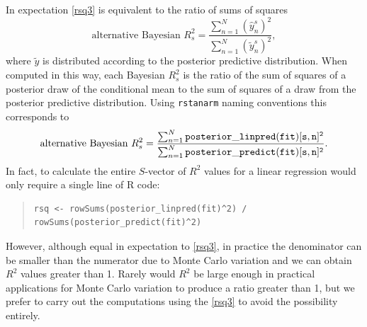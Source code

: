 \documentclass[11pt]{article}
\begin{document}
In expectation \eqref{rsq3} is equivalent to the ratio of sums of squares
%
\begin{equation}\label{rsq4}
\mbox{alternative Bayesian } R^2_s = 
	 \frac{\sum_{n=1}^N (\hat{y}_n^s)^2}{\sum_{n=1}^N (\tilde{y}_n^s)^2},
\end{equation}
%
where $\tilde{y}$ is distributed according to the posterior predictive distribution. 
When computed in this way, each Bayesian $R^2_s$ is the ratio of the sum of 
squares of a posterior draw of the conditional mean to the sum of squares of a 
draw from the posterior predictive distribution. Using {\tt rstanarm} naming 
conventions this corresponds to 
%
\begin{equation*}
\mbox{alternative Bayesian } R^2_s = 
	\frac{\sum_{n=1}^N {\tt posterior\_linpred(fit)[s, n]^2}}{\sum_{n=1}^N{\tt posterior\_predict(fit)[s, n]^2}}.
\end{equation*}
%
In fact, to calculate the entire $S$-vector of $R^2$ values for a linear regression would 
only require a single line of R code:
%
\vspace{-\baselineskip}
\begin{quotation}
\noindent
\begin{small}
\begin{verbatim}
rsq <- rowSums(posterior_linpred(fit)^2) / rowSums(posterior_predict(fit)^2)
\end{verbatim}
\end{small}
\end{quotation}
%
However, although equal in expectation to \eqref{rsq3}, in practice the denominator 
can be smaller than the numerator due to Monte Carlo variation and we can obtain  
$R^2$ values greater than 1. Rarely would $R^2$ be large enough in practical 
applications for Monte Carlo variation to produce a ratio greater than 1, but we
prefer to carry out the computations using the \eqref{rsq3} to avoid the 
possibility entirely. 
\end{document}
